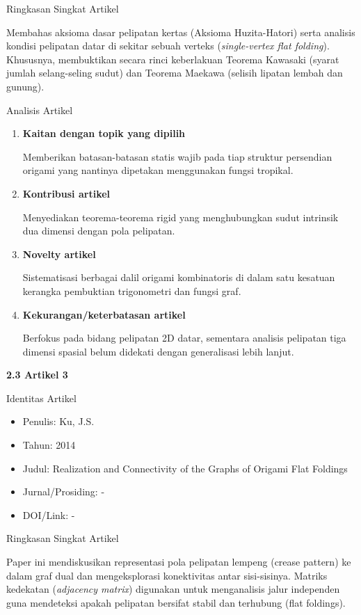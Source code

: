 \documentclass[12pt,a4paper]{article}
\begin{document}
\noindent Ringkasan Singkat Artikel\par
Membahas aksioma dasar pelipatan kertas (Aksioma Huzita-Hatori) serta analisis kondisi pelipatan datar di sekitar sebuah verteks (\textit{single-vertex flat folding}). Khususnya, membuktikan secara rinci keberlakuan Teorema Kawasaki (syarat jumlah selang-seling sudut) dan Teorema Maekawa (selisih lipatan lembah dan gunung).


\noindent Analisis Artikel
\begin{enumerate}
      \item \textbf{Kaitan dengan topik yang dipilih}\par
            Memberikan batasan-batasan statis wajib pada tiap struktur persendian origami yang nantinya dipetakan menggunakan fungsi tropikal.
      \item \textbf{Kontribusi artikel}\par
            Menyediakan teorema-teorema rigid yang menghubungkan sudut intrinsik dua dimensi dengan pola pelipatan.
      \item \textbf{Novelty artikel}\par
            Sistematisasi berbagai dalil origami kombinatoris di dalam satu kesatuan kerangka pembuktian trigonometri dan fungsi graf.
      \item \textbf{Kekurangan/keterbatasan artikel}\par
            Berfokus pada bidang pelipatan 2D datar, sementara analisis pelipatan tiga dimensi spasial belum didekati dengan generalisasi lebih lanjut.
\end{enumerate}

\newpage
\noindent\textbf{\large 2.3 Artikel 3 \cite{ku2014realization}}\par

\noindent Identitas Artikel
\begin{itemize}
      \item[-] Penulis: Ku, J.S.
      \item[-] Tahun: 2014
      \item[-] Judul: Realization and Connectivity of the Graphs of Origami Flat Foldings
      \item[-] Jurnal/Prosiding: -
      \item[-] DOI/Link: -
\end{itemize}


\noindent Ringkasan Singkat Artikel\par
Paper ini mendiskusikan representasi pola pelipatan lempeng (crease pattern) ke dalam graf dual dan mengeksplorasi konektivitas antar sisi-sisinya. Matriks kedekatan (\textit{adjacency matrix}) digunakan untuk menganalisis jalur independen guna mendeteksi apakah pelipatan bersifat stabil dan terhubung (flat foldings).
\end{document}
